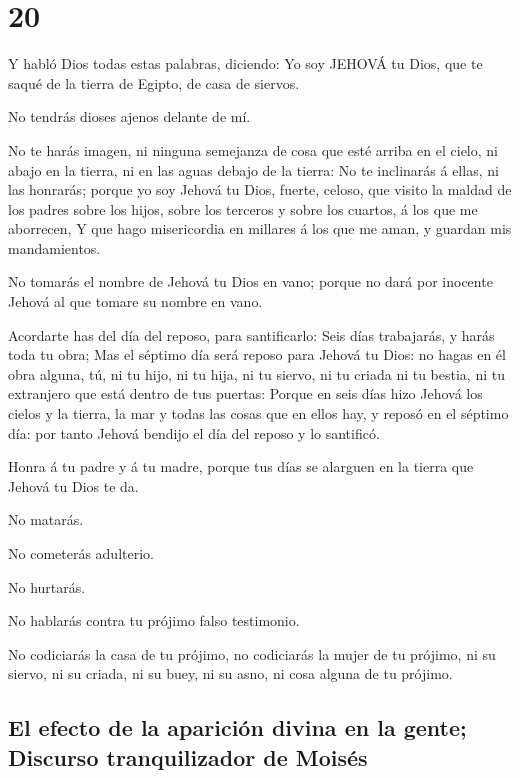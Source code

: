 \hypertarget{section-19}{%
\section{20}\label{section-19}}

 Y habló Dios todas estas palabras, diciendo: 
Yo soy JEHOVÁ tu Dios, que te saqué de la tierra de Egipto, de casa de
siervos.

 No tendrás dioses ajenos delante de mí.

 No te harás imagen, ni ninguna semejanza de cosa que esté
arriba en el cielo, ni abajo en la tierra, ni en las aguas debajo de la
tierra:  No te inclinarás á ellas, ni las honrarás; porque
yo soy Jehová tu Dios, fuerte, celoso, que visito la maldad de los
padres sobre los hijos, sobre los terceros y sobre los cuartos, á los
que me aborrecen,  Y que hago misericordia en millares á los
que me aman, y guardan mis mandamientos.

 No tomarás el nombre de Jehová tu Dios en vano; porque no
dará por inocente Jehová al que tomare su nombre en vano.

 Acordarte has del día del reposo, para santificarlo:
 Seis días trabajarás, y harás toda tu obra; 
Mas el séptimo día será reposo para Jehová tu Dios: no hagas en él obra
alguna, tú, ni tu hijo, ni tu hija, ni tu siervo, ni tu criada ni tu
bestia, ni tu extranjero que está dentro de tus puertas: 
Porque en seis días hizo Jehová los cielos y la tierra, la mar y todas
las cosas que en ellos hay, y reposó en el séptimo día: por tanto Jehová
bendijo el día del reposo y lo santificó.

 Honra á tu padre y á tu madre, porque tus días se alarguen
en la tierra que Jehová tu Dios te da.

 No matarás.

 No cometerás adulterio.

 No hurtarás.

 No hablarás contra tu prójimo falso testimonio.

 No codiciarás la casa de tu prójimo, no codiciarás la
mujer de tu prójimo, ni su siervo, ni su criada, ni su buey, ni su asno,
ni cosa alguna de tu prójimo.

\hypertarget{el-efecto-de-la-apariciuxf3n-divina-en-la-gente-discurso-tranquilizador-de-moisuxe9s}{%
\subsection{El efecto de la aparición divina en la gente; Discurso
tranquilizador de
Moisés}\label{el-efecto-de-la-apariciuxf3n-divina-en-la-gente-discurso-tranquilizador-de-moisuxe9s}}

